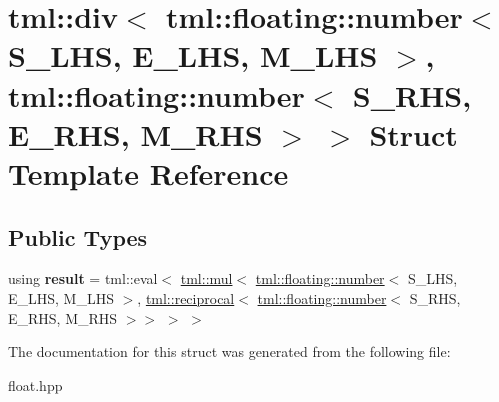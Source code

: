 \hypertarget{structtml_1_1div_3_01tml_1_1floating_1_1number_3_01S__LHS_00_01E__LHS_00_01M__LHS_01_4_00_01tml_6d9a211c2f0543fe73f071c9438c3d40}{\section{tml\+:\+:div$<$ tml\+:\+:floating\+:\+:number$<$ S\+\_\+\+L\+H\+S, E\+\_\+\+L\+H\+S, M\+\_\+\+L\+H\+S $>$, tml\+:\+:floating\+:\+:number$<$ S\+\_\+\+R\+H\+S, E\+\_\+\+R\+H\+S, M\+\_\+\+R\+H\+S $>$ $>$ Struct Template Reference}
\label{structtml_1_1div_3_01tml_1_1floating_1_1number_3_01S__LHS_00_01E__LHS_00_01M__LHS_01_4_00_01tml_6d9a211c2f0543fe73f071c9438c3d40}
}
\subsection*{Public Types}
\begin{DoxyCompactItemize}
\item 
\hypertarget{structtml_1_1div_3_01tml_1_1floating_1_1number_3_01S__LHS_00_01E__LHS_00_01M__LHS_01_4_00_01tml_6d9a211c2f0543fe73f071c9438c3d40_aff22697dc1ccedd10ffe18fe6c2974f9}{using {\bfseries result} = tml\+::eval$<$ \hyperlink{structtml_1_1mul}{tml\+::mul}$<$ \hyperlink{structtml_1_1floating_1_1number}{tml\+::floating\+::number}$<$ S\+\_\+\+L\+H\+S, E\+\_\+\+L\+H\+S, M\+\_\+\+L\+H\+S $>$, \hyperlink{structtml_1_1reciprocal}{tml\+::reciprocal}$<$ \hyperlink{structtml_1_1floating_1_1number}{tml\+::floating\+::number}$<$ S\+\_\+\+R\+H\+S, E\+\_\+\+R\+H\+S, M\+\_\+\+R\+H\+S $>$$>$ $>$ $>$}\label{structtml_1_1div_3_01tml_1_1floating_1_1number_3_01S__LHS_00_01E__LHS_00_01M__LHS_01_4_00_01tml_6d9a211c2f0543fe73f071c9438c3d40_aff22697dc1ccedd10ffe18fe6c2974f9}

\end{DoxyCompactItemize}


The documentation for this struct was generated from the following file\+:\begin{DoxyCompactItemize}
\item 
float.\+hpp\end{DoxyCompactItemize}

